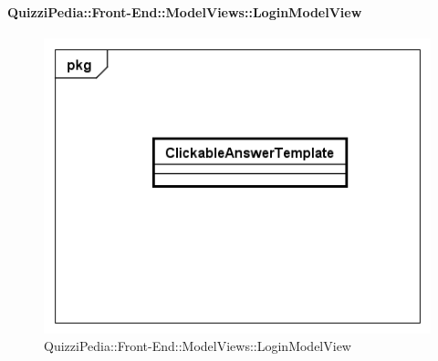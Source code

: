 	\paragraph{QuizziPedia::Front-End::ModelViews::LoginModelView}
	
	\label{QuizziPedia::Front-End::ModelViews::LoginModelView}
	
	\begin{figure}[ht]
		\centering
		\includegraphics[scale=0.5,keepaspectratio]{UML/Classi/Front-End/QuizziPedia_Front-end_Templates_ClickableAnswerTemplate.png}
		\caption{QuizziPedia::Front-End::ModelViews::LoginModelView}
	\end{figure} \FloatBarrier
	
